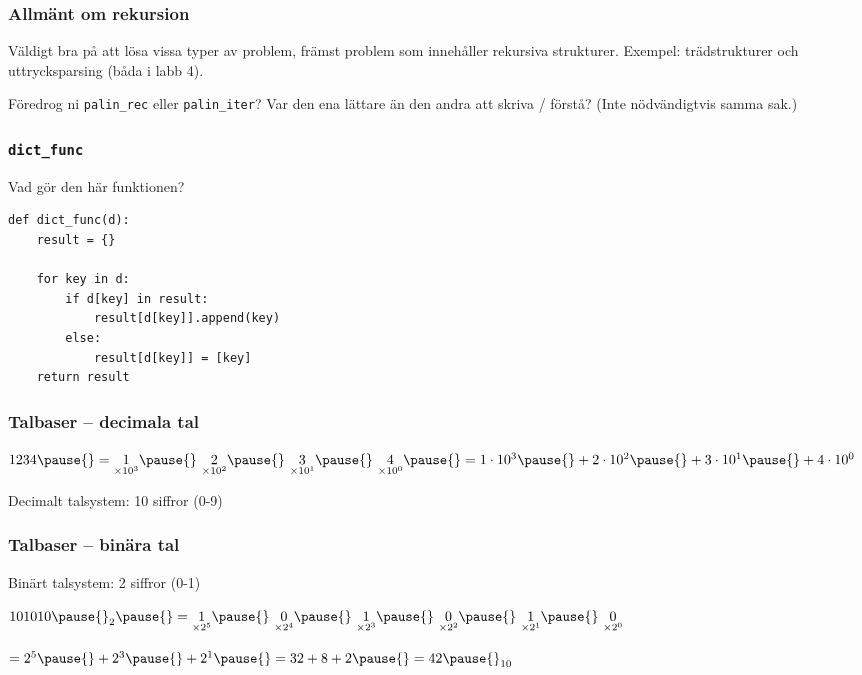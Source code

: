 \documentclass{beamer}
\begin{document}
  \begin{frame}
    \frametitle{Allmänt om rekursion}

    Väldigt bra på att lösa vissa typer av problem, främst problem som
    innehåller rekursiva strukturer. Exempel: trädstrukturer och uttrycksparsing
    (båda i labb 4).

    Föredrog ni \texttt{palin\_rec} eller \texttt{palin\_iter}? Var den ena
    lättare än den andra att skriva / förstå? (Inte nödvändigtvis samma sak.)

  \end{frame}

  \begin{frame}[fragile]
    \frametitle{\texttt{dict\_func}}

    Vad gör den här funktionen?

    \begin{verbatim}
def dict_func(d):
    result = {}

    for key in d:
        if d[key] in result:
            result[d[key]].append(key)
        else:
            result[d[key]] = [key]
    return result
    \end{verbatim}

  \end{frame}

  \begin{frame}
    \frametitle{Talbaser -- decimala tal}

    \(1234 \pause{} = \underset{\times 10^3}{1} \pause{}\ \underset{\times 10^2}{2} \pause{}\ \underset{\times 10^1}{3} \pause{}\ \underset{\times 10^0}{4} \pause{} = 1 \cdot 10^3 \pause{} + 2 \cdot 10^2 \pause{} + 3 \cdot 10^1 \pause{} + 4 \cdot 10^0\)

    \pause{}

    Decimalt talsystem: 10 siffror (0-9)

  \end{frame}

  \begin{frame}
    \frametitle{Talbaser -- binära tal}

    Binärt talsystem: 2 siffror (0-1)

    \pause{}

    \(101010\pause{}_2 \pause{} = \underset{\times 2^5}{1} \pause{}\ \underset{\times 2^4}{0} \pause{}\ \underset{\times 2^3}{1} \pause{}\ \underset{\times 2^2}{0} \pause{}\ \underset{\times 2^1}{1} \pause{}\ \underset{\times 2^0}{0}\)

    \pause{}

    \vspace{-0.5em}

    \(= 2^5 \pause{} + 2^3 \pause{} + 2^1 \pause{} = 32 + 8 + 2 \pause{} = 42\pause{}_{10}\)

  \end{frame}
\end{document}
